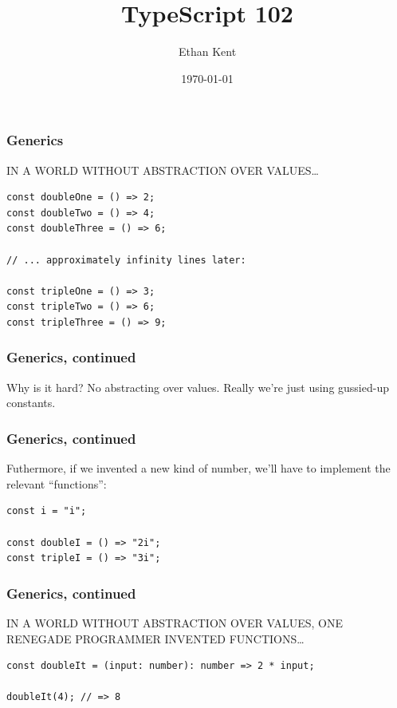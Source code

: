 \documentclass[aspectratio=169]{beamer}
\title{TypeScript 102}
\author{Ethan Kent}
\institute{Spoonflower}
\date{\today}
\begin{document}
\frame{\titlepage}

\begin{frame}[fragile]
  \frametitle{Generics}

  IN A WORLD WITHOUT ABSTRACTION OVER VALUES\ldots \\

  \begin{verbatim}
const doubleOne = () => 2;
const doubleTwo = () => 4;
const doubleThree = () => 6;

// ... approximately infinity lines later:

const tripleOne = () => 3;
const tripleTwo = () => 6;
const tripleThree = () => 9;
  \end{verbatim}
\end{frame}

\begin{frame}
  \frametitle{Generics, continued}

  Why is it hard? No abstracting over values. Really we're just using
  gussied-up constants.

\end{frame}

\begin{frame}[fragile]
  \frametitle{Generics, continued}
  Futhermore, if we invented a new kind of number, we'll have to implement
  the relevant ``functions'': \\

  \begin{verbatim}
const i = "i";

const doubleI = () => "2i";
const tripleI = () => "3i";
  \end{verbatim}
\end{frame}

\begin{frame}[fragile]
  \frametitle{Generics, continued}

  IN A WORLD WITHOUT ABSTRACTION OVER VALUES, ONE RENEGADE PROGRAMMER
  INVENTED FUNCTIONS\ldots \\

  \begin{verbatim}
const doubleIt = (input: number): number => 2 * input;

doubleIt(4); // => 8
  \end{verbatim}
\end{frame}
\end{document}
